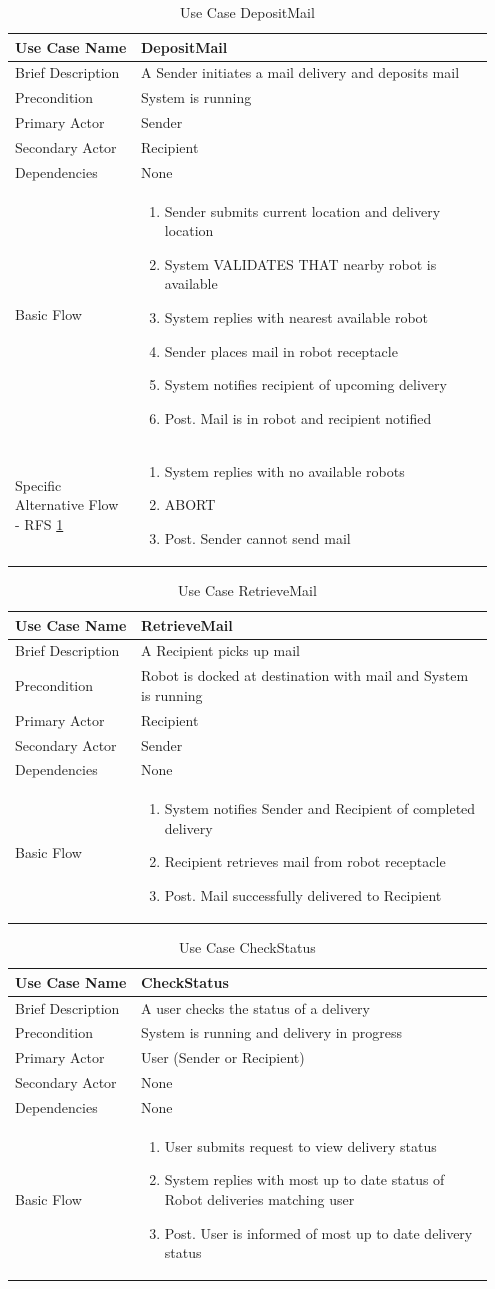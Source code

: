 \documentclass[12pt]{report}
\newcommand\tabularhead[1]{
    \begin{table}[H]
      \caption{Use Case #1}
      \begin{tabular}{|p{0.25\linewidth}|p{0.7\linewidth}|}
        \hline
        \textbf{Use Case Name} & \textbf{#1} \\
        \hline}
\newcommand\addrow[2]{#1 &#2\\ \hline}
\newcommand\addmulrow[2]{ \begin{minipage}[t][][t]{4cm}\raggedright#1\end{minipage} 
         &\begin{minipage}[t][][t]{10cm}
          \begin{enumerate} #2   \end{enumerate}
          \end{minipage} \vspace{0.1cm} \\ \hline}
\newenvironment{usecase}{\tabularhead}
    {\end{tabular}\end{table}}
\begin{document}
\begin{usecase}{DepositMail}
    \addrow{Brief Description}{A Sender initiates a mail delivery and deposits mail}
    \addrow{Precondition}{System is running}
    \addrow{Primary Actor}{Sender}
    \addrow{Secondary Actor}{Recipient}
    \addrow{Dependencies}{None}
    \addmulrow{Basic Flow}{
        \item Sender submits current location and delivery location
        \item System VALIDATES THAT nearby robot is available \label{validatesAvailable}
        \item System replies with nearest available robot
        \item Sender places mail in robot receptacle
        \item System notifies recipient of upcoming delivery
        \item [Post.] Mail is in robot and recipient notified
    }
    \addmulrow{Specific Alternative Flow - RFS \ref{validatesAvailable}}{
        \item System replies with no available robots
        \item ABORT
        \item[Post.] Sender cannot send mail
    }
\end{usecase}

\begin{usecase}{RetrieveMail}
    \addrow{Brief Description}{A Recipient picks up mail}
    \addrow{Precondition}{Robot is docked at destination with mail and System is running}
    \addrow{Primary Actor}{Recipient}
    \addrow{Secondary Actor}{Sender}
    \addrow{Dependencies}{None}
    \addmulrow{Basic Flow}{
        \item System notifies Sender and Recipient of completed delivery
        \item Recipient retrieves mail from robot receptacle
        \item[Post.] Mail successfully delivered to Recipient
    }
\end{usecase}

\begin{usecase}{CheckStatus}
    \addrow{Brief Description}{A user checks the status of a delivery}
    \addrow{Precondition}{System is running and delivery in progress}
    \addrow{Primary Actor}{User (Sender or Recipient)}
    \addrow{Secondary Actor}{None}
    \addrow{Dependencies}{None}
    \addmulrow{Basic Flow}{
        \item User submits request to view delivery status
        \item System replies with most up to date status of Robot deliveries matching user
        \item[Post.] User is informed of most up to date delivery status
    }
\end{usecase}
\end{document}
